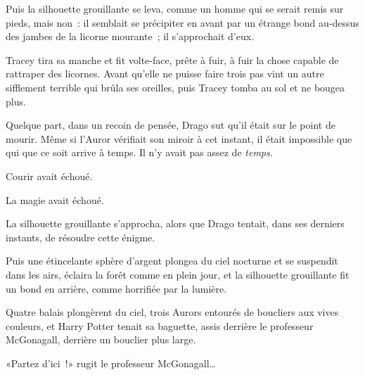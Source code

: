 Puis la silhouette grouillante se leva, comme un homme qui se serait remis sur pieds, mais non~: il semblait se précipiter en avant par un étrange bond au-dessus des jambes de la licorne mourante~; il s'approchait d'eux.

Tracey tira sa manche et fit volte-face, prête à fuir, à fuir la chose capable de rattraper des licornes. Avant qu'elle ne puisse faire trois pas vint un autre sifflement terrible qui brûla ses oreilles, puis Tracey tomba au sol et ne bougea plus.

Quelque part, dans un recoin de pensée, Drago sut qu'il était sur le point de mourir. Même si l'Auror vérifiait son miroir à cet instant, il était impossible que qui que ce soit arrive à temps. Il n'y avait pas assez de \emph{temps}.

Courir avait échoué.

La magie avait échoué.

La silhouette grouillante s'approcha, alors que Drago tentait, dans ses derniers instants, de résoudre cette énigme.

Puis une étincelante sphère d'argent plongea du ciel nocturne et se suspendit dans les airs, éclaira la forêt comme en plein jour, et la silhouette grouillante fit un bond en arrière, comme horrifiée par la lumière.

Quatre balais plongèrent du ciel, trois Aurors entourés de boucliers aux vives couleurs, et Harry Potter tenait sa baguette, assis derrière le professeur McGonagall, derrière un bouclier plus large.

«Partez d'ici~!» rugit le professeur McGonagall…

